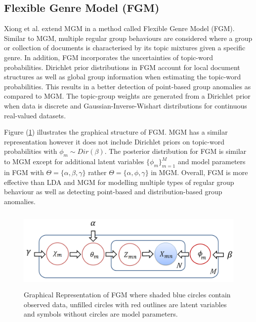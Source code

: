  
 

\subsection{ Flexible Genre Model (FGM) }
 Xiong et al. \cite{FGM} extend MGM in a method called Flexible Genre Model (FGM).  Similar to MGM, multiple regular group behaviours are considered where a group or collection of documents is characterised by its topic  mixtures given a specific genre.  In addition, FGM  incorporates the uncertainties  of topic-word probabilities.   Dirichlet prior distributions in FGM account for  local document  structures as well as global group information  when estimating the topic-word probabilities.   This results in a better detection of point-based group anomalies as compared to MGM. 
 The topic-group weights are generated from a Dirichlet prior when data is discrete and Gaussian-Inverse-Wishart distributions for continuous real-valued datasets.
 
 Figure (\ref{Fig:FGM}) illustrates the graphical structure of FGM. MGM has a similar representation however it does not include Dirichlet priors on topic-word probabilities with $\phi_m \sim Dir(\beta)$. %
  The posterior distribution for FGM is similar to MGM  except for additional latent variables  $\{ \phi_m\}_{m=1}^M$ and model parameters in FGM with $\Theta=\{\alpha,\beta,\gamma\}$ rather $\Theta=\{\alpha,\phi,\gamma\}$ in MGM. %
     Overall, FGM is more effective than LDA and MGM for modelling multiple types of regular group behaviour as well as detecting point-based and distribution-based group anomalies. 

 
\begin{figure}[H]
\centering
\includegraphics[width=14cm, height=4cm,trim=0cm 0cm 0cm 0.4cm]
{FIGURES/FGM} 
\caption{Graphical Representation of FGM where shaded blue circles contain observed data, unfilled  circles with red outlines are latent variables and symbols without circles are model parameters.}
\label{Fig:FGM}
\end{figure}
  

